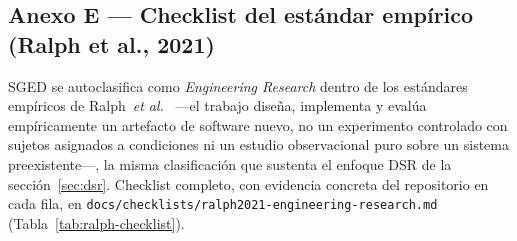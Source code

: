 \documentclass[11pt,a4paper]{article}
\newcommand{\ruta}[1]{\texttt{\footnotesize #1}}
\begin{document}
\subsection*{Anexo E --- Checklist del estándar empírico (Ralph et al., 2021)}

SGED se autoclasifica como \emph{Engineering Research} dentro de los
estándares empíricos de Ralph~\emph{et al.}~\cite{ralph2021} —el
trabajo diseña, implementa y evalúa empíricamente un artefacto de
software nuevo, no un experimento controlado con sujetos asignados a
condiciones ni un estudio observacional puro sobre un sistema
preexistente—, la misma clasificación que sustenta el enfoque DSR de
la sección~\ref{sec:dsr}. Checklist completo, con evidencia concreta
del repositorio en cada fila, en
\ruta{docs/checklists/ralph2021-engineering-research.md}
(Tabla~\ref{tab:ralph-checklist}).
\end{document}
